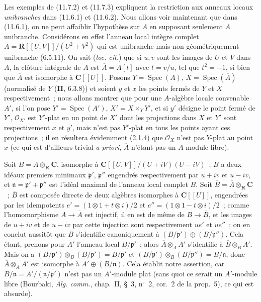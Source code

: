 \begin{env}[11.7.5]
Les exemples de (11.7.2) et (11.7.3) expliquent la restriction aux anneaux
locaux \emph{unibranches} dans (11.6.1) et (11.6.2). Nous allons voir maintenant
que dans (11.6.1), on ne peut affaiblir l'hypothèse sur $A$ en supposant
seulement $A$ unibranche. Considérons en effet l'anneau local intègre complet
$A=\mathbf R[[U,V]]/(U^2+V^2)$ qui est unibranche mais non géométriquement
unibranche (6.5.11). On sait (\emph{loc. cit.}) que si $u,v$ sont les images de
$U$ et $V$ dans $A$, la clôture intégrale de $A$ est $\overline A=A[t]$ avec
$t=v/u$, tel que $t^2=-1$, si bien que $\overline A$ est isomorphe à
$\mathbf C[[U]]$. Posons $Y=\operatorname{Spec}(A)$,
$X=\operatorname{Spec}(\overline A)$ (normalisé de $Y$ (\textbf{II}, 6.3.8)) et
soient $y$ et $x$ les points fermés de $Y$ et $X$ respectivement~; nous allons
montrer que pour une $A$-algèbre locale convenable $A'$, si l'on pose
$Y'=\operatorname{Spec}(A')$, $X'=X\times_Y Y'$, et si $y'$ désigne le point
fermé de $Y'$, $\mathcal O_{X'}$ est $Y'$-plat en un point de $X'$ dont les
projections dans $X$ et $Y'$ sont respectivement $x$ et $y'$, mais n'est pas
$Y'$-plat en tous les points ayant ces projections~; il en résultera évidemment
(2.1.4) que $\mathcal O_X$ n'est pas $Y$-plat au point $x$ (ce qui est d'ailleurs
trivial \emph{a priori}, $\overline A$ n'étant pas un $A$-module libre).

Soit $B=A\otimes_{\mathbf R}\mathbf C$, isomorphe à
$\mathbf C[[U,V]]/(U+iV)(U-iV)$~; $B$ a deux idéaux premiers minimaux
$\mathfrak p'$, $\mathfrak p''$ engendrés respectivement par $u+iv$ et $u-iv$,
et $\mathfrak n=\mathfrak p'+\mathfrak p''$ est l'idéal maximal de l'anneau
local complet $B$. Soit $\overline B=\overline A\otimes_{\mathbf R}\mathbf C$~;
$\overline B$ est composée directe de deux algèbres isomorphes à
$\mathbf C[[U]]$, engendrées par les idempotents
$e'=(1\otimes1+t\otimes i)/2$ et $e''=(1\otimes1-t\otimes i)/2$~; comme
l'homomorphisme $A\to\overline A$ est injectif, il en est de même de
$B\to\overline B$, et les images de $u+iv$ et de $u-iv$ par cette injection sont
respectivement $ue'$ et $ue''$~; on en conclut aussitôt que $\overline B$
s'identifie canoniquement à $(B/\mathfrak p')\oplus(B/\mathfrak p'')$. Cela
étant, prenons pour $A'$ l'anneau local $B/\mathfrak p'$~; alors
$\overline A\otimes_A A'$ s'identifie à $\overline B\otimes_B A'$. Mais on a
$(B/\mathfrak p')\otimes_B(B/\mathfrak p')=B/\mathfrak p'$ et
$(B/\mathfrak p')\otimes_B(B/\mathfrak p'')=B/\mathfrak n$, donc
$\overline A\otimes_A A'$ est isomorphe à $A'\oplus(B/\mathfrak n)$. Cela
établit notre assertion, car $B/\mathfrak n=A'/(\mathfrak n/\mathfrak p')$
n'est pas un $A'$-module plat (sans quoi ce serait un $A'$-module libre
(Bourbaki, \emph{Alg. comm.}, chap.~II, \S~3, n$^\circ$~2, cor.~2 de la
prop.~5), ce qui est absurde).
\end{env}

